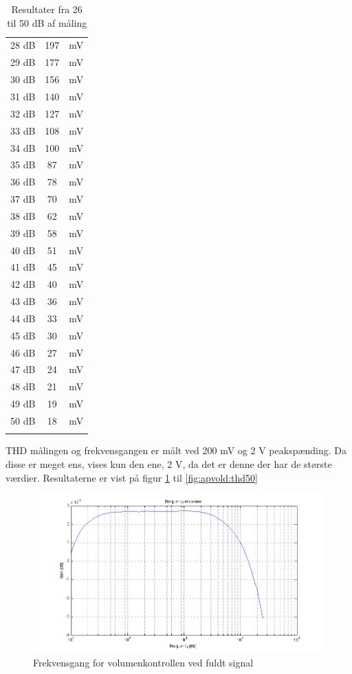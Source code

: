 \begin{table}[h]
\begin{minipage}[b]{0.45\linewidth}
\begin{tabular}{l|c|l}
28 dB & 197 & mV \\[4pt]
29 dB & 177 & mV \\[4pt]
30 dB & 156 & mV \\[4pt]
31 dB & 140 & mV \\[4pt]
32 dB & 127 & mV \\[4pt]
33 dB & 108 & mV \\[4pt]
34 dB & 100 & mV \\[4pt]
35 dB & 87 & mV \\[4pt]
36 dB & 78 & mV \\[4pt]
37 dB & 70 & mV \\[4pt]
38 dB & 62 & mV \\[4pt]
39 dB & 58 & mV \\[4pt]
40 dB & 51 & mV \\[4pt]
41 dB & 45 & mV \\[4pt]
42 dB & 40 & mV \\[4pt]
43 dB & 36 & mV \\[4pt]
44 dB & 33 & mV \\[4pt]
45 dB & 30 & mV \\[4pt]
46 dB & 27 & mV \\[4pt]
47 dB & 24 & mV \\[4pt]
48 dB & 21 & mV \\[4pt]
49 dB & 19 & mV \\[4pt]
50 dB & 18 & mV \\
& & \\[4pt]
\hline\hline
\end{tabular}
\caption{Resultater fra 26 til 50 dB af måling}
\label{tab:resultat_volumenkontrol2}
\end{minipage}
\end{table}

THD målingen og frekvensgangen er målt ved 200 mV og 2 V peakspænding. Da disse er meget ens, vises kun den ene, 2 V, da det er denne der har de største værdier. Resultaterne er vist på figur \ref{fig:apvold:frek0} til \ref{fig:apvold:thd50}

\begin{figure}[h]
\centering
\includegraphics[width=\textwidth]{maalerapporter/volumenkontrol/2Vniveau0-frek.png}
\caption{Frekvensgang for volumenkontrollen ved fuldt signal}
\label{fig:apvold:frek0}
\end{figure}

